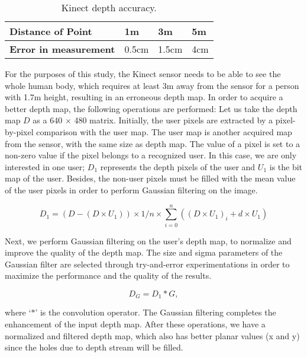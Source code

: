 \begin{table}
\center
\begin{tabular}{ | l | l | l | l |}
\hline
\textbf{Distance of Point} & 1m & 3m & 5m \\ \hline
\textbf{Error in measurement} & 0.5cm & 1.5cm & 4cm \\ 
\hline
\end{tabular}
\caption{Kinect depth accuracy.}
\label{tbl:error_kinect}
\end{table}

For the purposes of this study, the Kinect sensor needs to be able to see the whole human body, which requires at least 3m away from the sensor for a person with 1.7m height, resulting in an erroneous depth map. In order to acquire a better depth map, the following operations are performed: Let us take the depth map $D$ as a 640 $\times$ 480 matrix. Initially, the user pixels are extracted by a pixel-by-pixel comparison with the user map. The user map is another acquired map from the sensor, with the same size as depth map. The value of a pixel is set to a non-zero value if the pixel belongs to a recognized user. In this case, we are only interested in one user; $D_1$ represents the depth pixels of the user and $U_1$ is the bit map of the user. Besides, the non-user pixels must be filled with the mean value of the user pixels in order to perform Gaussian filtering on the image.

\begin{equation}
D_1=(D-(D \times U_1 )) \times 1/n \times \sum\limits_{i=0}^n ((D \times U_1 )_i + d \times U_1 )
\label{eqn:patch_depth}
\end{equation}

Next, we perform Gaussian filtering on the user's depth map, to normalize and improve the quality of the depth map. The size and sigma parameters of the Gaussian filter are selected through try-and-error experimentations in order to maximize the performance and the quality of the results. 

\begin{equation}
D_G=D_1*G,
\label{eqn:gaussian_convolution}
\end{equation}

\noindent where `$*$' is the convolution operator. The Gaussian filtering completes the enhancement of the input depth map. 
After these operations, we have a normalized and filtered depth map, which also has better planar values (x and y) since the holes due to depth stream will be filled.

